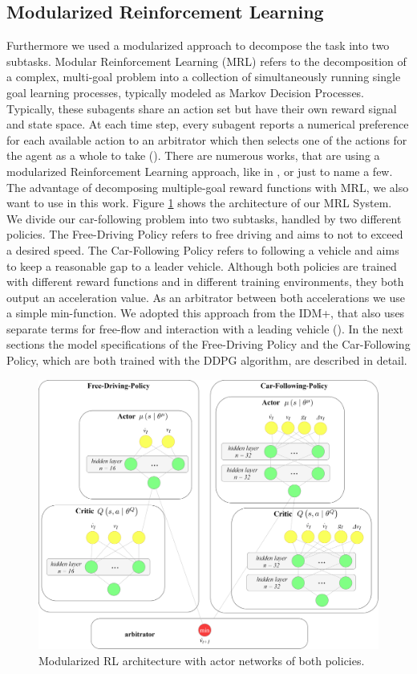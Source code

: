 \documentclass[review]{elsarticle}
\providecommand{\3}{{\ss}}
\begin{document}
  
  \subsection{\label{MRL}Modularized Reinforcement Learning}
  Furthermore we used a modularized approach to decompose the task into two subtasks. Modular Reinforcement Learning (MRL) refers to the decomposition of a complex, multi-goal
  problem into a collection of simultaneously running single goal learning processes, typically modeled as Markov Decision Processes. Typically, these subagents share an action
  set but have their own reward signal and state space. At each
  time step, every subagent reports a numerical preference for
  each available action to an arbitrator which then selects one
  of the actions for the agent as a whole to take (\cite{MRL}). There are numerous works, that are using a modularized Reinforcement Learning approach, like in \cite{MRLexample1}, \cite{MRLexample2} or \cite{MRLexample3} just to name a few. The advantage of decomposing multiple-goal reward functions with MRL, we also want to use in this work. 
  Figure \ref{fig:MRL} shows the architecture of our MRL System. We divide our car-following problem into two subtasks, handled by two different policies. The Free-Driving Policy refers to free driving and aims to not to exceed a desired speed. The Car-Following Policy refers to following a vehicle and aims to keep a reasonable gap to a leader vehicle. Although both policies are trained with different reward functions and in different training environments, they both output an acceleration value. As an arbitrator between both accelerations we use a simple min-function. We adopted this approach from the IDM+, that also uses separate terms for free-flow and interaction with a leading vehicle (\cite{idm_plus}). In the next sections the model specifications of the Free-Driving Policy and the Car-Following Policy, which are both trained with the DDPG algorithm, are described in detail.
  
  \begin{figure}
  	\centering
  	\includegraphics[width=12cm]{images/MRL_small}
  	\caption{Modularized RL architecture with actor networks of both policies.} 
  	\label{fig:MRL}
  \end{figure}
\end{document}
